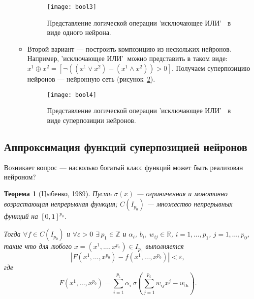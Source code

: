 \documentclass{article}
\newtheorem{theorem}{Теорема}
\begin{document}
\begin{enumerate}
\begin{itemize}
			\begin{figure}[H]
				\begin{center}
					\begin{minipage}{0.75\linewidth}
						\texttt{[image: bool3]}
						\caption{Представление логической операции 'исключающее ИЛИ' $~$ в виде одного нейрона.}
						\label{bool3}
					\end{minipage}
				\end{center}
			\end{figure}
			
			\item Второй вариант --- построить композицию из нескольких нейронов. Например, 'исключающее ИЛИ'$~$ можно представить в таком виде: $x^1 \oplus x^2 = [\lnot((x^1\lor x^2) - (x^1 \wedge x^2))>0]$. Получаем суперпозицию нейронов --- нейронную сеть (рисунок~\ref{bool4}).
			
			\begin{figure}[H]
				\begin{center}
					\begin{minipage}{0.75\linewidth}
						\texttt{[image: bool4]}
						\caption{Представление логической операции 'исключающее ИЛИ' $~$ в виде суперпозиции нейронов.}
						\label{bool4}
					\end{minipage}
				\end{center}
			\end{figure}
			
		\end{itemize}
	\end{enumerate}
	
	\subsection{Аппроксимация функций суперпозицией нейронов}
	
	Возникает вопрос --- насколько богатый класс функций может быть реализован нейроном? 
	
	\begin{theorem}[Цыбенко, 1989]
		Пусть $\sigma(x)$ --- ограниченная и монотонно возрастающая непрерывная функция; $C(I_{p_0})$ --- множество непрерывных функций на $[0,1]^{p_0}$.
		
		Тогда $\forall f \in C(I_{p_0})$ и $\forall \varepsilon > 0$  $\exists ~p_1 \in \mathbb{Z}$ и  $\alpha_i$, $b_i$, $w_{ij} \in \mathbb{R}$, $i=1,\ldots,p_1$, $j=1,\ldots, p_0$, такие что для любого $x=(x^1, \ldots, x^{p_0}) \in I_{p_0}$ выполняется
		\begin{equation*}
			| F(x^1, \ldots, x^{p_0}) - f(x^1, \ldots, x^{p_0})| < \varepsilon,
		\end{equation*}
		где  \begin{equation*}
			F(x^1, \ldots, x^{p_0})=\sum_{i=1}^{p_1} \alpha_i \, \sigma \left(\sum_{j=1}^{p_0} w_{ij} x^j  -w_{0i}   \right).
		\end{equation*}
	\end{theorem}	
	
\end{document}
